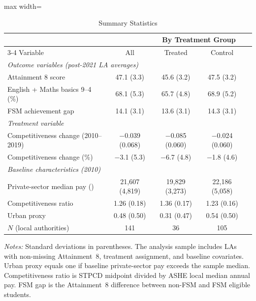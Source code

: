 \documentclass[12pt]{article}
\begin{document}
\begin{table}[H]
\centering
\caption{Summary Statistics}
\label{tab:summary}
\begin{adjustbox}{max width=\textwidth}
\begin{threeparttable}
\begin{tabular}{lcccc}
\toprule
& & \multicolumn{2}{c}{By Treatment Group} \\
\cmidrule(lr){3-4}
Variable & All & Treated & Control \\
\midrule
\multicolumn{4}{l}{\textit{Outcome variables (post-2021 LA averages)}} \\
Attainment 8 score & 47.1 (3.3) & 45.6 (3.2) & 47.5 (3.2) \\
English + Maths basics 9--4 (\%) & 68.1 (5.3) & 65.7 (4.8) & 68.9 (5.2) \\
FSM achievement gap & 14.1 (3.1) & 13.6 (3.1) & 14.3 (3.1) \\[6pt]
\multicolumn{4}{l}{\textit{Treatment variable}} \\
Competitiveness change (2010--2019) & $-$0.039 (0.068) & $-$0.085 (0.060) & $-$0.024 (0.060) \\
Competitiveness change (\%) & $-$3.1 (5.3) & $-$6.7 (4.8) & $-$1.8 (4.6) \\[6pt]
\multicolumn{4}{l}{\textit{Baseline characteristics (2010)}} \\
Private-sector median pay (\textsterling{}) & 21,607 (4,819) & 19,829 (3,273) & 22,186 (5,058) \\
Competitiveness ratio & 1.26 (0.18) & 1.36 (0.17) & 1.23 (0.16) \\
Urban proxy & 0.48 (0.50) & 0.31 (0.47) & 0.54 (0.50) \\[6pt]
$N$ (local authorities) & 141 & 36 & 105 \\
\bottomrule
\end{tabular}
\begin{tablenotes}[flushleft]
\small
\item \textit{Notes:} Standard deviations in parentheses. The analysis sample includes LAs with non-missing Attainment~8, treatment assignment, and baseline covariates. Urban proxy equals one if baseline private-sector pay exceeds the sample median. Competitiveness ratio is STPCD midpoint divided by ASHE local median annual pay. FSM gap is the Attainment~8 difference between non-FSM and FSM eligible students.
\end{tablenotes}
\end{threeparttable}
\end{adjustbox}
\end{table}
\end{document}
